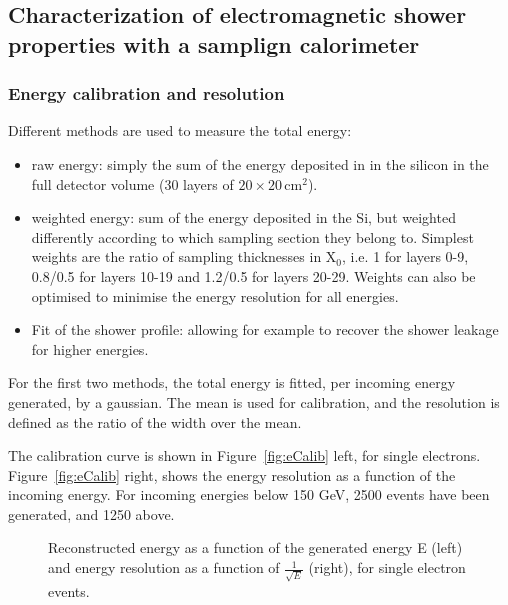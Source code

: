 %
%
%
\subsection{Characterization of electromagnetic shower properties with
a samplign calorimeter}
\label{sec:emshowerproperties}


\subsubsection{Energy calibration and resolution}
\label{subsubsec:energyresol}

Different methods are used to measure the total energy:
\begin{itemize}
\item raw energy: simply the sum of the energy deposited in  in
  the silicon in the full detector volume (30 layers of $20 \times
  20$\,cm$^2$).
\item weighted energy: sum of the energy deposited in the Si, but
  weighted differently according to which sampling section they belong
  to. Simplest weights are the ratio of sampling thicknesses in X$_0$,
  i.e. 1 for layers 0-9, 0.8/0.5 for layers 10-19 and 1.2/0.5 for
  layers 20-29. Weights can also be optimised to minimise the energy
  resolution for all energies.
\item Fit of the shower profile: allowing for example to recover the
  shower leakage for higher energies.
\end{itemize}

For the first two methods, the total energy is fitted, per incoming
energy generated, by a gaussian. The mean is used for calibration, and
the resolution is defined as the ratio of the width over the mean.

The calibration curve is shown in Figure~\ref{fig:eCalib} left, for
single electrons. Figure~\ref{fig:eCalib} right, shows the energy
resolution as a function of the incoming energy. For incoming energies
below 150 GeV, 2500 events have been generated, and 1250 above.

\begin{figure}[h!]
  \begin{center}
    \caption{Reconstructed energy as a function of the generated
      energy E (left) and energy resolution as a function of
      $\frac{1}{\sqrt{E}}$ (right), for single electron events.}
    \label{fig:g4vis}
  \end{center}
\end{figure}

